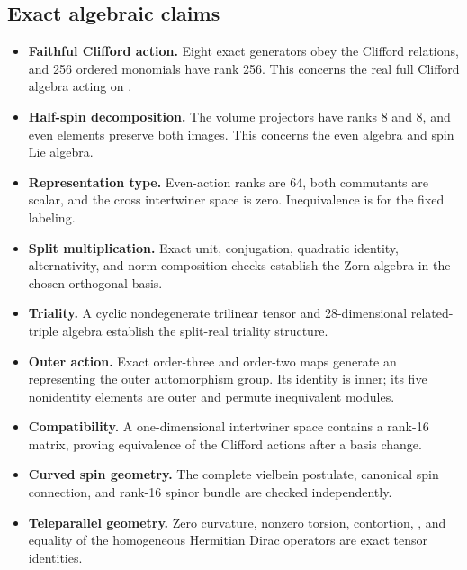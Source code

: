 \documentclass[11pt]{article}
\begin{document}
\subsection{Exact algebraic claims}

\begin{itemize}
\item \textbf{Faithful Clifford action.} Eight exact generators obey the Clifford
relations, and 256 ordered monomials have rank 256. This concerns the real full Clifford algebra acting on \texttt{}.

\item \textbf{Half-spin decomposition.} The volume projectors have ranks 8 and 8, and
even elements preserve both images. This concerns the even algebra and spin Lie algebra.

\item \textbf{Representation type.} Even-action ranks are 64, both commutants are
scalar, and the cross intertwiner space is zero. Inequivalence is for the fixed \texttt{} labeling.

\item \textbf{Split multiplication.} Exact unit, conjugation, quadratic identity,
alternativity, and norm composition checks establish the Zorn algebra in the chosen orthogonal basis.

\item \textbf{Triality.} A cyclic nondegenerate trilinear tensor and 28-dimensional
related-triple algebra establish the split-real triality structure.

\item \textbf{Outer action.} Exact order-three and order-two maps generate an \texttt{}
representing the outer automorphism group. Its identity is inner; its five nonidentity elements are outer and permute inequivalent modules.

\item \textbf{Compatibility.} A one-dimensional intertwiner space contains a rank-16
matrix, proving equivalence of the Clifford actions after a basis change.

\item \textbf{Curved spin geometry.} The complete vielbein postulate, canonical spin
connection, and rank-16 spinor bundle are checked independently.

\item \textbf{Teleparallel geometry.} Zero curvature, nonzero torsion, contortion,
\texttt{}, and equality of the homogeneous Hermitian Dirac operators are exact tensor identities.

\end{itemize}
\end{document}
